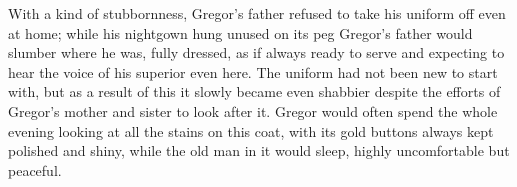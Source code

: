 \documentclass[11pt,openany]{memoir}
\begin{document}
With a kind of stubbornness, Gregor's father refused to take his
uniform off even at home; while his nightgown hung unused on its peg
Gregor's father would slumber where he was, fully dressed, as if
always ready to serve and expecting to hear the voice of his
superior even here.  The uniform had not been new to start with, but
as a result of this it slowly became even shabbier despite the
efforts of Gregor's mother and sister to look after it.  Gregor
would often spend the whole evening looking at all the stains on
this coat, with its gold buttons always kept polished and shiny,
while the old man in it would sleep, highly uncomfortable but
peaceful.
\end{document}

